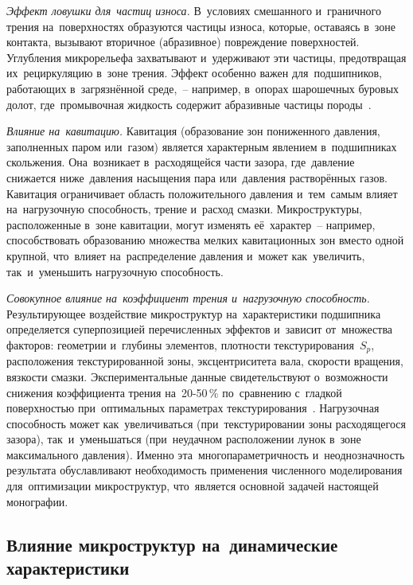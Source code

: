 \textit{Эффект ловушки для~частиц износа.} В~условиях смешанного и~граничного трения на~поверхностях образуются частицы износа, которые, оставаясь в~зоне контакта, вызывают вторичное (абразивное) повреждение поверхностей. Углубления микрорельефа захватывают и~удерживают эти частицы, предотвращая их~рециркуляцию в~зоне трения. Эффект особенно важен для~подшипников, работающих в~загрязнённой среде,~-- например, в~опорах шарошечных буровых долот, где~промывочная жидкость содержит абразивные частицы породы~\cite{bashmur2024a}.

\textit{Влияние на~кавитацию.} Кавитация (образование зон пониженного давления, заполненных паром или~газом) является характерным явлением в~подшипниках скольжения. Она~возникает в~расходящейся части зазора, где~давление снижается ниже~давления насыщения пара или~давления растворённых газов. Кавитация ограничивает область положительного давления и~тем~самым влияет на~нагрузочную способность, трение и~расход смазки. Микроструктуры, расположенные в~зоне кавитации, могут изменять её~характер~-- например, способствовать образованию множества мелких кавитационных зон вместо одной крупной, что~влияет на~распределение давления и~может как~увеличить, так~и~уменьшить нагрузочную способность.

\textit{Совокупное влияние на~коэффициент трения и~нагрузочную способность.} Результирующее воздействие микроструктур на~характеристики подшипника определяется суперпозицией перечисленных эффектов и~зависит от~множества факторов: геометрии и~глубины элементов, плотности текстурирования~$S_p$, расположения текстурированной зоны, эксцентриситета вала, скорости вращения, вязкости смазки. Экспериментальные данные свидетельствуют о~возможности снижения коэффициента трения на~20-50\,\% по~сравнению с~гладкой поверхностью при~оптимальных параметрах текстурирования~\cite{galda2019,yamada2018,ranjan2021}. Нагрузочная способность может как~увеличиваться (при~текстурировании зоны расходящегося зазора), так~и~уменьшаться (при~неудачном расположении лунок в~зоне максимального давления). Именно эта~многопараметричность и~неоднозначность результата обуславливают необходимость применения численного моделирования для~оптимизации микроструктур, что~является основной задачей настоящей монографии.

\subsection{Влияние микроструктур на~динамические характеристики}

